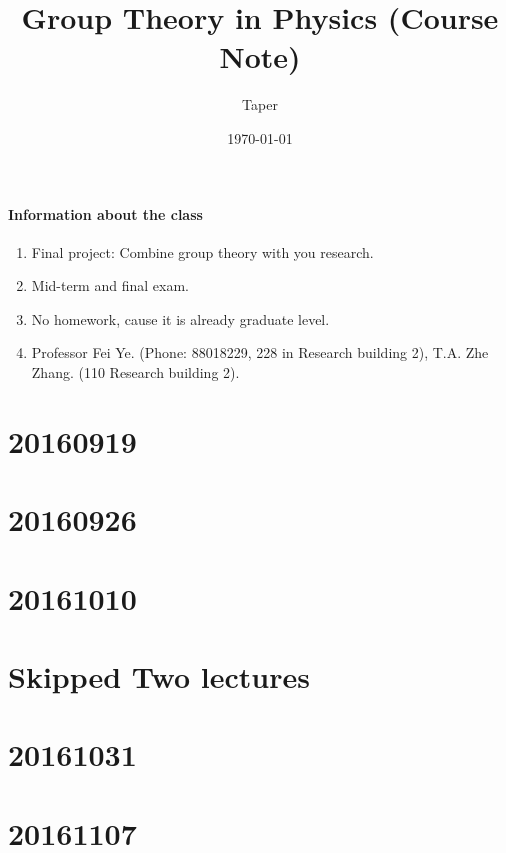 \documentclass{article}
\title{Group Theory in Physics (Course Note)}
\date{\today}
\author{Taper}
\begin{document}
\maketitle
{}
\tableofcontents
\paragraph{Information about the class}
\begin{enumerate}
    \item Final project: Combine group theory with you research.
    \item Mid-term and final exam.
    \item No homework, cause it is already graduate level.
    \item Professor Fei Ye. (Phone: 88018229, 228 in Research building 2), 
        T.A. Zhe Zhang. (110 Research building 2).
\end{enumerate}

\section{20160919}
\label{sec:20160919}


\section{20160926}
\label{sec:20160926}


\section{20161010}
\label{sec:20161010}


\section{Skipped Two lectures}


\section{20161031}
\label{sec:20161031}


\section{20161107}
\label{sec:20161107}

\end{document}
